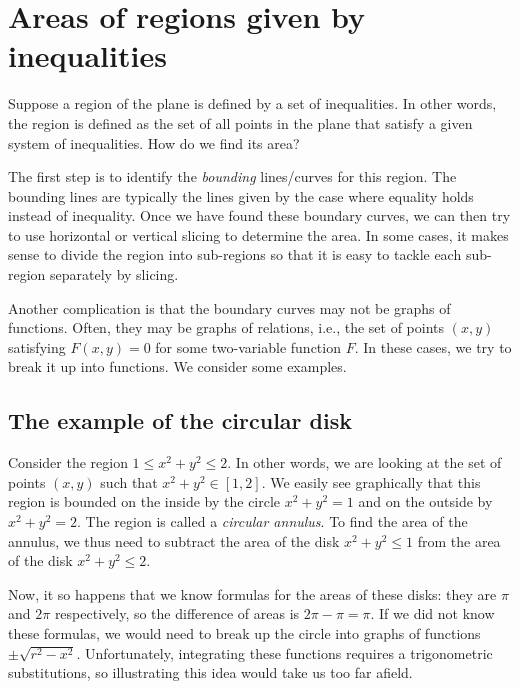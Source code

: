 \documentclass[10pt]{amsart}
\begin{document}
\section{Areas of regions given by inequalities}

Suppose a region of the plane is defined by a set of inequalities. In
other words, the region is defined as the set of all points in the
plane that satisfy a given system of inequalities. How do we find its area?

The first step is to identify the {\em bounding} lines/curves for this
region. The bounding lines are typically the lines given by the case
where equality holds instead of inequality. Once we have found these
boundary curves, we can then try to use horizontal or vertical slicing
to determine the area. In some cases, it makes sense to divide the
region into sub-regions so that it is easy to tackle each sub-region
separately by slicing.

Another complication is that the boundary curves may not be graphs of
functions. Often, they may be graphs of relations, i.e., the set of
points $(x,y)$ satisfying $F(x,y) = 0$ for some two-variable function
$F$. In these cases, we try to break it up into functions. We consider
some examples.

\subsection{The example of the circular disk}

Consider the region $1 \le x^2 + y^2 \le 2$. In other words, we are
looking at the set of points $(x,y)$ such that $x^2 + y^2 \in
[1,2]$. We easily see graphically that this region is bounded on the
inside by the circle $x^2 + y^2 = 1$ and on the outside by $x^2 + y^2
= 2$. The region is called a {\em circular annulus}. To find the area
of the annulus, we thus need to subtract the area of the disk $x^2 +
y^2 \le 1$ from the area of the disk $x^2 + y^2 \le 2$.

Now, it so happens that we know formulas for the areas of these disks:
they are $\pi$ and $2\pi$ respectively, so the difference of areas is
$2\pi - \pi = \pi$. If we did not know these formulas, we would need
to break up the circle into graphs of functions $\pm \sqrt{r^2 -
x^2}$. Unfortunately, integrating these functions requires a
trigonometric substitutions, so illustrating this idea would take us
too far afield.
\end{document}
